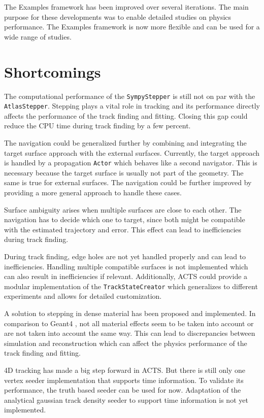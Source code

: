 The Examples framework has been improved over several iterations. The main purpose for these developments was to enable detailed studies on physics performance. The Examples framework is now more flexible and can be used for a wide range of studies.

\section{Shortcomings}

The computational performance of the \texttt{SympyStepper} is still not on par with the \texttt{AtlasStepper}. Stepping plays a vital role in tracking and its performance directly affects the performance of the track finding and fitting. Closing this gap could reduce the CPU time during track finding by a few percent.

The navigation could be generalized further by combining and integrating the target surface approach with the external surfaces. Currently, the target approach is handled by a propagation \texttt{Actor} which behaves like a second navigator. This is necessary because the target surface is usually not part of the geometry. The same is true for external surfaces. The navigation could be further improved by providing a more general approach to handle these cases.

Surface ambiguity arises when multiple surfaces are close to each other. The navigation has to decide which one to target, since both might be compatible with the estimated trajectory and error. This effect can lead to inefficiencies during track finding.

During track finding, edge holes are not yet handled properly and can lead to inefficiencies. Handling multiple compatible surfaces is not implemented which can also result in inefficiencies if relevant. Additionally, ACTS could provide a modular implementation of the \texttt{TrackStateCreator} which generalizes to different experiments and allows for detailed customization.

A solution to stepping in dense material has been proposed and implemented. In comparison to Geant4 \cite{geant4-2003}\cite{geant4-2006}\cite{geant4-2016}, not all material effects seem to be taken into account or are not taken into account the same way. This can lead to discrepancies between simulation and reconstruction which can affect the physics performance of the track finding and fitting.

4D tracking has made a big step forward in ACTS. But there is still only one vertex seeder implementation that supports time information. To validate its performance, the truth based seeder can be used for now. Adaptation of the analytical gaussian track density seeder to support time information is not yet implemented.

